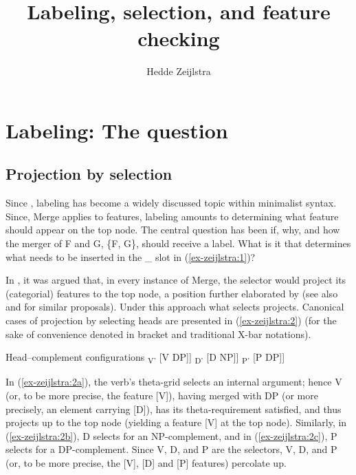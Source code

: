 \documentclass[output=paper
,modfonts
,nonflat]{langsci/langscibook}
\title{Labeling, selection, and feature checking}
\author{Hedde Zeijlstra\affiliation{Georg-August-University Göttingen}}
\begin{document}
	\maketitle

\section{Labeling: The question}
\subsection{Projection by selection}
Since \citet{Chomsky1995}, labeling has become a widely discussed topic within minimalist syntax. Since, Merge applies to features, labeling amounts to determining what feature should appear on the top node. The central question has been if, why, and how the merger of F and G, \{F, G\}, should receive a label. What is it that determines what needs to be inserted in the \_ slot in (\ref{ex-zeijlstra:1})?

\begin{exe} 
\exbox{\label{ex-zeijlstra:1}
	\begin{forest}	
		[\_
		[F]
		[G] ]
	\end{forest}}
\end{exe}
In \citet{Chomsky1995}, it was argued that, in every instance of Merge, the selector would project its (categorial) features to the top node, a position further elaborated by \citet{Adger2003} (see also \citealt{Boeckx2008} and \citealt{Cecchetto_Donati2010} for similar proposals). Under this approach what selects projects. Canonical cases of projection by selecting heads are presented in (\ref{ex-zeijlstra:2}) (for the sake of convenience denoted in bracket and traditional X-bar notations). 

\begin{exe}
\ex Head–complement configurations \label{ex-zeijlstra:2}
	\xlist
	\ex {[}\textsubscript{V'} {[}V DP{]}{]} \label{ex-zeijlstra:2a}
	\ex {[}\textsubscript{D'} {[}D NP{]}{]} \label{ex-zeijlstra:2b}
	\ex {[}\textsubscript{P'} {[}P DP{]}{]} \label{ex-zeijlstra:2c}
	\endxlist
\end{exe}
In (\ref{ex-zeijlstra:2a}), the verb’s theta-grid selects an internal argument; hence V (or, to be more precise, the feature {[}V{]}), having merged with DP (or more precisely, an element carrying [D]), has its theta-requirement satisfied, and thus projects up to the top node (yielding a feature {[}V{]} at the top node). Similarly, in (\ref{ex-zeijlstra:2b}), D selects for an NP-complement, and in (\ref{ex-zeijlstra:2c}), P selects for a DP-complement. Since V, D, and P are the selectors, V, D, and P (or, to be more precise, the {[}V{]}, {[}D{]} and {[}P{]} features) percolate up.
\end{document}
